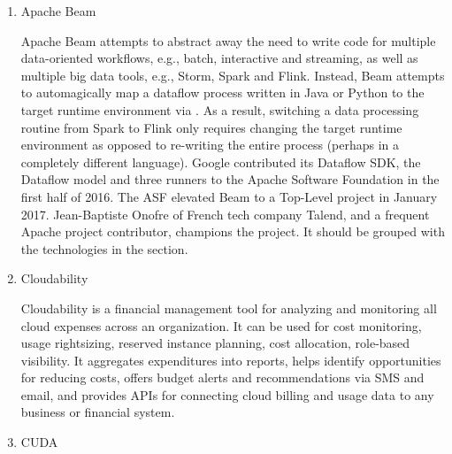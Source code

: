 \begin{enumerate}
\item {} 
Apache Beam

Apache Beam attempts to abstract away the need to write
code for multiple data-oriented workflows, e.g., batch, interactive and
streaming, as well as multiple big data tools, e.g., Storm, Spark and
Flink.  Instead, Beam attempts to automagically map a dataflow process
written in Java or Python to the target runtime environment via .
As a result, switching a data processing routine from Spark to Flink only
requires changing the target runtime environment as opposed to re-writing
the entire process \label{\detokenize{i524/technologies:id699}}{\hyperref[\detokenize{i524/technologies:www-infoworld-apachebeam}]{\sphinxcrossref{{[}610{]}}}} (perhaps in a
completely different language).  Google contributed its Dataflow SDK, the
Dataflow model and three runners \label{\detokenize{i524/technologies:id700}}{\hyperref[\detokenize{i524/technologies:www-datanami-apachebeam}]{\sphinxcrossref{{[}611{]}}}} to the
Apache Software Foundation in the first half of 2016.  The ASF elevated
Beam to a Top-Level project in January 2017.  Jean-Baptiste Onofre of
French tech company Talend, and a frequent Apache project contributor,
champions the project. \label{\detokenize{i524/technologies:id701}}{\hyperref[\detokenize{i524/technologies:www-talend-apachebeam}]{\sphinxcrossref{{[}612{]}}}}  It should be grouped
with the technologies in the  section.

\item {} 
Cloudability

Cloudability is a financial management tool for analyzing and
monitoring all cloud expenses across an organization. It can be
used for cost monitoring, usage rightsizing, reserved instance
planning, cost allocation, role-based visibility. It aggregates
expenditures into reports, helps identify opportunities for
reducing costs, offers budget alerts and recommendations via SMS
and email, and provides APIs for connecting cloud billing and
usage data to any business or financial
system. \label{\detokenize{i524/technologies:id702}}{\hyperref[\detokenize{i524/technologies:www-cloudability}]{\sphinxcrossref{{[}613{]}}}}

\item {} 
CUDA


\end{enumerate}

